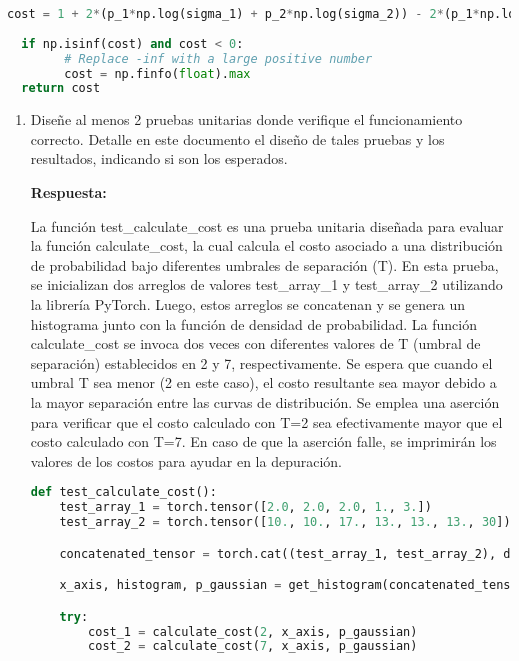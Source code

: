 \documentclass[spanish]{article}
\begin{document}
\begin{enumerate}
\begin{enumerate}
\begin{lstlisting}[language=Python, caption=Calculo de Costos]
  cost = 1 + 2*(p_1*np.log(sigma_1) + p_2*np.log(sigma_2)) - 2*(p_1*np.log(p_1) + p_2*np.log(p_2))
  
  if np.isinf(cost) and cost < 0:
        # Replace -inf with a large positive number
        cost = np.finfo(float).max 
  return cost
\end{lstlisting}

\begin{enumerate}
\item Diseñe al menos 2 pruebas unitarias donde verifique el funcionamiento
correcto. Detalle en este documento el diseño de tales pruebas y los
resultados, indicando si son los esperados.
\vspace{5px}

\par \textbf{Respuesta:}
\vspace{5px}

\par La función test\_calculate\_cost es una prueba unitaria diseñada para evaluar la función calculate\_cost, la cual calcula el costo asociado a una distribución de probabilidad bajo diferentes umbrales de separación (T). En esta prueba, se inicializan dos arreglos de valores test\_array\_1 y test\_array\_2 utilizando la librería PyTorch. Luego, estos arreglos se concatenan y se genera un histograma junto con la función de densidad de probabilidad. La función calculate\_cost se invoca dos veces con diferentes valores de T (umbral de separación) establecidos en 2 y 7, respectivamente. Se espera que cuando el umbral T sea menor (2 en este caso), el costo resultante sea mayor debido a la mayor separación entre las curvas de distribución. Se emplea una aserción para verificar que el costo calculado con T=2 sea efectivamente mayor que el costo calculado con T=7. En caso de que la aserción falle, se imprimirán los valores de los costos para ayudar en la depuración.
\vspace{5px}

\begin{lstlisting}[language=Python, caption=Pruebas Unitarias]
def test_calculate_cost():
    test_array_1 = torch.tensor([2.0, 2.0, 2.0, 1., 3.])
    test_array_2 = torch.tensor([10., 10., 17., 13., 13., 13., 30])

    concatenated_tensor = torch.cat((test_array_1, test_array_2), dim=0)

    x_axis, histogram, p_gaussian = get_histogram(concatenated_tensor)

    try:
        cost_1 = calculate_cost(2, x_axis, p_gaussian)
        cost_2 = calculate_cost(7, x_axis, p_gaussian)


\end{lstlisting}
\end{enumerate}
\end{enumerate}
\end{enumerate}
\end{document}
